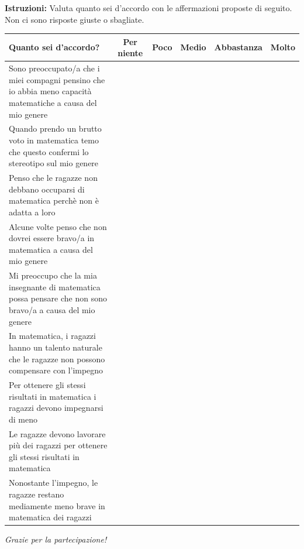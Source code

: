 \documentclass[11pt]{article}
\begin{document}
\vspace{1cm}

\noindent\textbf{Istruzioni:} Valuta quanto sei d'accordo con le affermazioni proposte di seguito. Non ci sono risposte giuste o sbagliate.
\newline

\noindent
\begin{tabularx}{\textwidth}{|X|c|c|c|c|c|}
  \hline
  \textbf{Quanto sei d'accordo?} & \textbf{\scriptsize Per niente} & \textbf{\scriptsize Poco} & \textbf{\scriptsize Medio} & \textbf{\scriptsize Abbastanza} & \textbf{\scriptsize Molto} \\
  \hline
  Sono preoccupato/a che i miei compagni pensino che io abbia meno capacità matematiche a causa del mio genere & & & & & \\
  \hline
  Quando prendo un brutto voto in matematica temo che questo confermi lo stereotipo sul mio genere & & & & & \\
  \hline
  Penso che le ragazze non debbano occuparsi di matematica perchè non è adatta a loro & & & & & \\
  \hline
  Alcune volte penso che non dovrei essere bravo/a in matematica a causa del mio genere & & & & & \\
  \hline
  Mi preoccupo che la mia insegnante di matematica possa pensare che non sono bravo/a a causa del mio genere & & & & & \\
  \hline
  In matematica, i ragazzi hanno un talento naturale che le ragazze non possono compensare con l’impegno & & & & & \\
  \hline 
  Per ottenere gli stessi risultati in matematica i ragazzi devono impegnarsi di meno & & & & & \\
  \hline
  Le ragazze devono lavorare più dei ragazzi per ottenere gli stessi risultati in matematica & & & & & \\
  \hline
  Nonostante l’impegno, le ragazze restano mediamente meno brave in matematica dei ragazzi & & & & & \\
  \hline
\end{tabularx}

\vspace{2cm}
\centerline{\textit{Grazie per la partecipazione!}}
\end{document}
